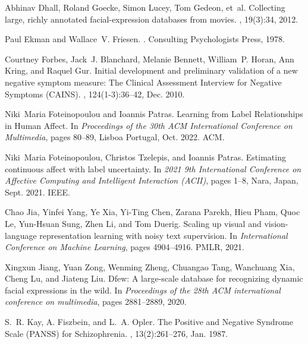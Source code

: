 \documentclass[10pt,twocolumn,letterpaper]{article}
\begin{document}
{\begin{thebibliography}{10}
Abhinav Dhall, Roland Goecke, Simon Lucey, Tom Gedeon, et~al.
\newblock Collecting large, richly annotated facial-expression databases from
  movies.
, 19(3):34, 2012.

Paul Ekman and Wallace~V. Friesen.
.
\newblock Consulting Psychologists Press, 1978.

Courtney Forbes, Jack~J. Blanchard, Melanie Bennett, William~P. Horan, Ann
  Kring, and Raquel Gur.
\newblock Initial development and preliminary validation of a new negative
  symptom measure: {The} {Clinical} {Assessment} {Interview} for {Negative}
  {Symptoms} ({CAINS}).
, 124(1-3):36--42, Dec. 2010.

Niki~Maria Foteinopoulou and Ioannis Patras.
\newblock Learning from {Label} {Relationships} in {Human} {Affect}.
\newblock In {\em Proceedings of the 30th {ACM} {International} {Conference} on
  {Multimedia}}, pages 80--89, Lisboa Portugal, Oct. 2022. ACM.

Niki~Maria Foteinopoulou, Christos Tzelepis, and Ioannis Patras.
\newblock Estimating continuous affect with label uncertainty.
\newblock In {\em 2021 9th {International} {Conference} on {Affective}
  {Computing} and {Intelligent} {Interaction} ({ACII})}, pages 1--8, Nara,
  Japan, Sept. 2021. IEEE.

Chao Jia, Yinfei Yang, Ye Xia, Yi-Ting Chen, Zarana Parekh, Hieu Pham, Quoc Le,
  Yun-Hsuan Sung, Zhen Li, and Tom Duerig.
\newblock Scaling up visual and vision-language representation learning with
  noisy text supervision.
\newblock In {\em International Conference on Machine Learning}, pages
  4904--4916. PMLR, 2021.

Xingxun Jiang, Yuan Zong, Wenming Zheng, Chuangao Tang, Wanchuang Xia, Cheng
  Lu, and Jiateng Liu.
\newblock Dfew: A large-scale database for recognizing dynamic facial
  expressions in the wild.
\newblock In {\em Proceedings of the 28th ACM international conference on
  multimedia}, pages 2881--2889, 2020.

S.~R. Kay, A. Fiszbein, and L.~A. Opler.
\newblock The {Positive} and {Negative} {Syndrome} {Scale} ({PANSS}) for
  {Schizophrenia}.
, 13(2):261--276, Jan. 1987.


\end{thebibliography}}
\end{document}
